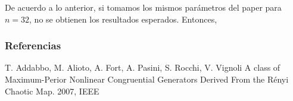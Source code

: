 \documentclass{llncs}
\begin{document}
De acuerdo a lo anterior, si tomamos los mismos parámetros del paper para $n=32$, no se obtienen los resultados esperados. Entonces, 


\subsubsection*{Referencias}




%
%

\begin{thebibliography}{1}
 T. Addabbo, M. Alioto, A. Fort, A. Pasini, S. Rocchi, V. Vignoli
 A class of Maximum-Perior Nonlinear Congruential Generators Derived From the Rényi Chaotic Map.
 2007, IEEE 
\end{thebibliography}
\end{document}
